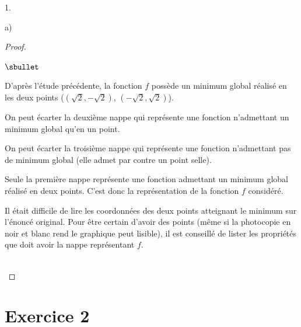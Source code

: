 \documentclass[11pt]{article}%
\begin{document}
\begin{noliste}{1.}
\begin{noliste}{a)}
    
    \begin{proof}~%
      \begin{noliste}{$\sbullet$}
      \item D'après l'étude précédente, la fonction $f$ possède un
        minimum global réalisé en les deux points ($(\sqrt{2},
        -\sqrt{2})$, $(-\sqrt{2}, \sqrt{2})$).
      \item On peut écarter la deuxième nappe qui représente une
        fonction n'admettant un minimum global qu'en un point.
      \item On peut écarter la troisième nappe qui représente une
        fonction n'admettant pas de minimum global (elle admet par
        contre un point selle).
      \item Seule la première nappe représente une fonction admettant
        un minimum global réalisé en deux points. C'est donc la
        représentation de la fonction $f$ considéré.          
      \end{noliste}
      \begin{remark}%
        Il était difficile de lire les coordonnées des deux points
        atteignant le minimum sur l'énoncé original. Pour être certain
        d'avoir des points (même si la photocopie en noir et blanc
        rend le graphique peut lisible), il est conseillé de lister
        les propriétés que doit avoir la nappe représentant $f$.
      \end{remark}~\\[-1.4cm]
    \end{proof}
  \end{noliste}
\end{noliste}

\section*{Exercice 2}
\end{document}
